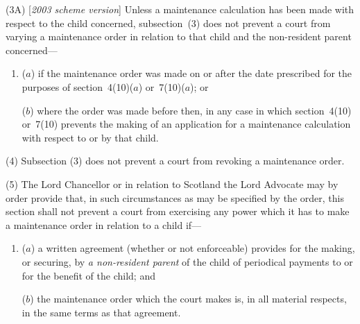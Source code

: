 \documentclass[12pt,a4paper]{article}
\begin{document}
(3A) [\emph{2003 scheme version}] Unless a maintenance calculation has been made with respect to the child concerned, subsection~(3)  does not prevent a court from varying a maintenance order in relation to that child and the non-resident parent concerned—
\begin{enumerate}\item[]
($a$) if the maintenance order was made on or after the date prescribed for the purposes of section~4(10)($a$)  or~7(10)($a$); or

($b$) where the order was made before then, in any case in which section~4(10)  or~7(10)  prevents the making of an application for a maintenance calculation with respect to or by that child.
\end{enumerate}

(4) Subsection (3)  does not prevent a court from revoking a maintenance order.

(5) The Lord Chancellor or in relation to Scotland the Lord Advocate may by order provide that, in such circumstances as may be specified by the order, this section shall not prevent a court from exercising any power which it has to make a maintenance order in relation to a child if—
\begin{enumerate}\item[]
($a$) a written agreement (whether or not enforceable) provides for the making, or securing, by 
\emph{a non-resident parent}  %
of the child of periodical payments to or for the benefit of the child; and

($b$) the maintenance order which the court makes is, in all material respects, in the same terms as that agreement.
\end{enumerate}
\end{document}
